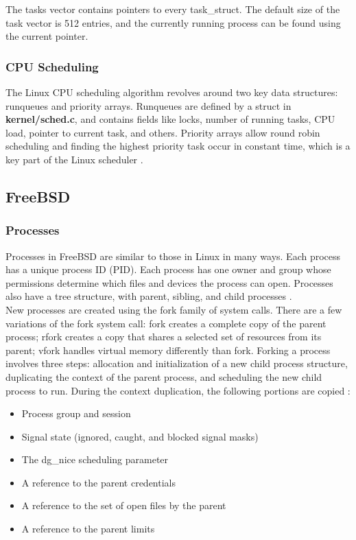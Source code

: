\documentclass[letterpaper,draftclsnofoot,10pt,onecolumn,titlepage]{IEEEtran}\usepackage[margin=0.75in]{geometry}
\begin{document}
        The tasks vector contains pointers to every task\_struct. The default size of the task vector is 512 entries, and
        the currently running process can be found using the current pointer.

        \subsubsection{CPU Scheduling}
        The Linux CPU scheduling algorithm revolves around two key data structures: runqueues and priority arrays. 
        Runqueues are defined by a struct in \textbf{kernel/sched.c}, and contains fields like locks, number of running
        tasks, CPU load, pointer to current task, and others. Priority arrays allow round robin scheduling and finding 
        the highest priority task occur in constant time, which is a key part of the Linux scheduler \cite{linuxscheduler}.

    \subsection{FreeBSD}
        \subsubsection{Processes}
        Processes in FreeBSD are similar to those in Linux in many ways. Each process has a unique process ID (PID). Each
        process has one owner and group whose permissions determine which files and devices the process can open. Processes
        also have a tree structure, with parent, sibling, and child processes \cite{freebsdfork}.
        \\
        New processes are created using the fork family of system calls. There are a few variations of the fork system 
        call: fork creates a complete copy of the parent process; rfork creates a copy that shares a selected set of
        resources from its parent; vfork handles virtual memory differently than fork. Forking a process involves 
        three steps: allocation and initialization of a new child process structure, duplicating the context of the 
        parent process, and scheduling the new child process to run. During the context duplication, the following 
        portions are copied \cite{freebsdfork}:
        
        \begin{itemize}
            \item Process group and session
            \item Signal state (ignored, caught, and blocked signal masks)
            \item The dg\_nice scheduling parameter 
            \item A reference to the parent credentials
            \item A reference to the set of open files by the parent
            \item A reference to the parent limits
        \end{itemize}
\end{document}
